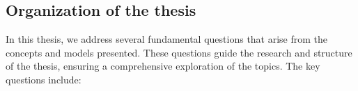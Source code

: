 





\subsection{Organization of the thesis}

In this thesis, we address several fundamental questions that arise from the
concepts and models presented. These questions guide the research and structure
of the thesis, ensuring a comprehensive exploration of the topics. The key
questions include:




